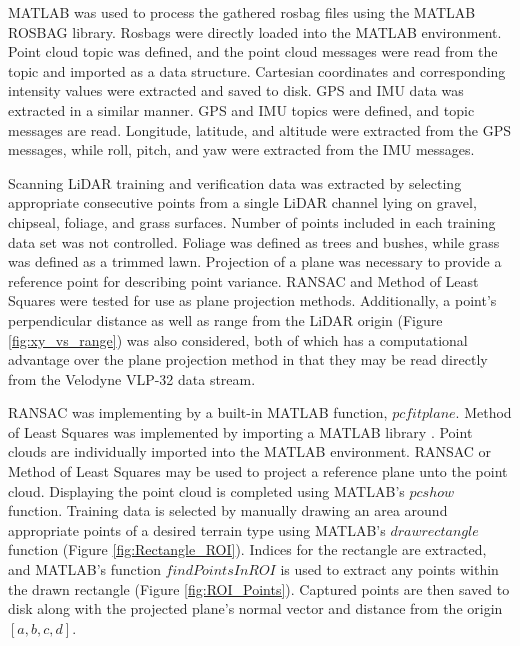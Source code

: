 \documentclass[journal,onecolumn]{IEEEtran}
\begin{document}
	{MATLAB was used to process the gathered rosbag files using the MATLAB ROSBAG library. Rosbags were directly loaded into the MATLAB environment. Point cloud topic was defined, and the point cloud messages were read from the topic and imported as a data structure. Cartesian coordinates and corresponding intensity values were extracted and saved to disk. GPS and IMU data was extracted in a similar manner. GPS and IMU topics were defined, and topic messages are read. Longitude, latitude, and altitude were extracted from the GPS messages, while roll, pitch, and yaw were extracted from the IMU messages.}
	
	{Scanning LiDAR training and verification data was extracted by selecting appropriate consecutive points from a single LiDAR channel lying on gravel, chipseal, foliage, and grass surfaces. Number of points included in each training data set was not controlled. Foliage was defined as trees and bushes, while grass was defined as a trimmed lawn. Projection of a plane was necessary to provide a reference point for describing point variance. RANSAC and Method of Least Squares were tested for use as plane projection methods. Additionally, a point's perpendicular distance as well as range from the LiDAR origin (Figure \ref{fig:xy_vs_range}) was also considered, both of which has a computational advantage over the plane projection method in that they may be read directly from the Velodyne VLP-32 data stream.}
	
	{RANSAC was implementing by a built-in MATLAB function, $pcfitplane$. Method of Least Squares was implemented by importing a MATLAB library \cite{noauthor_object-oriented_nodate}. Point clouds are individually imported into the MATLAB environment. RANSAC or Method of Least Squares may be used to project a reference plane unto the point cloud. Displaying the point cloud is completed using MATLAB's $pcshow$ function. Training data is selected by manually drawing an area around appropriate points of a desired terrain type using MATLAB's $drawrectangle$ function (Figure \ref{fig:Rectangle_ROI}). Indices for the rectangle are extracted, and MATLAB's function $findPointsInROI$ is used to extract any points within the drawn rectangle (Figure \ref{fig:ROI_Points}). Captured points are then saved to disk along with the projected plane's normal vector and distance from the origin $[a,b,c,d]$.}
	
\end{document}
